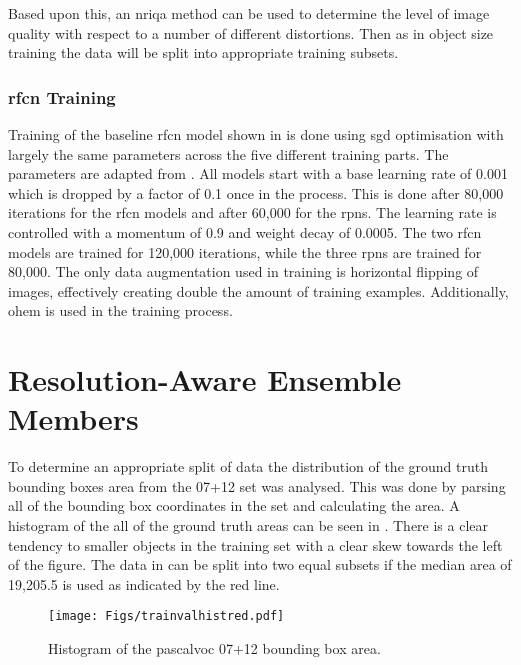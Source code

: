 \documentclass[a4paper,twoside]{article}
\begin{document}
Based upon this, an \gls{nriqa} method can be used to determine the level of image quality with respect to a number of different distortions. Then as in object size training the data will be split into appropriate training subsets. 

\subsubsection{\gls{rfcn} Training}
Training of the baseline \gls{rfcn} model shown in  is done using \gls{sgd} optimisation with largely the same parameters across the five different training parts. The parameters are adapted from \cite{rfcn}. All models start with a base learning rate of 0.001 which is dropped by a factor of 0.1 once in the process. This is done after 80,000 iterations for the \gls{rfcn} models and after 60,000 for the \glspl{rpn}. The learning rate is controlled with a momentum of 0.9 and weight decay of 0.0005. The two \gls{rfcn} models are trained for 120,000 iterations, while the three \glspl{rpn} are trained for 80,000.
The only data augmentation used in training is horizontal flipping of images, effectively creating double the amount of training examples. Additionally, \gls{ohem} \cite{ohem} is used in the training process.

\section{Resolution-Aware Ensemble Members}
To determine an appropriate split of data the distribution of the ground truth bounding boxes area from the 07+12 set was analysed. This was done by parsing all of the bounding box coordinates in the set and calculating the area. A histogram of the all of the ground truth areas can be seen in . There is a clear tendency to smaller objects in the training set with a clear skew towards the left of the figure. The data in  can be split into two equal subsets if the median area of 19,205.5 is used as indicated by the red line. 

\begin{figure}[H]
  \centering
    \texttt{[image: Figs/trainvalhistred.pdf]}
      \caption{Histogram of the \gls{pascalvoc} 07+12 bounding box area.}
    \label{fig:0712hist}
\end{figure}
\end{document}
